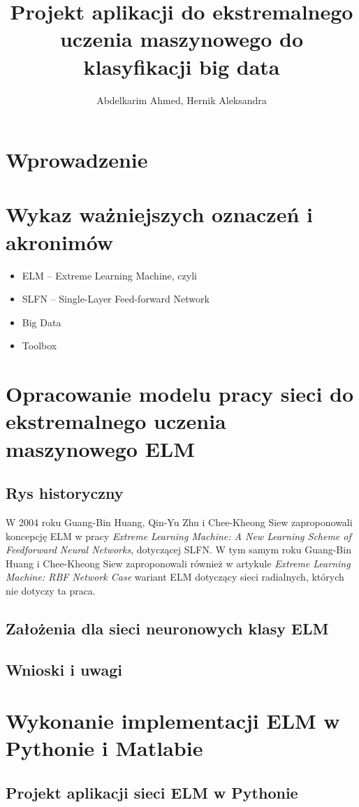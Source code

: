 \documentclass{article}
\title{Projekt aplikacji do ekstremalnego uczenia maszynowego do klasyfikacji big data}
\author{Abdelkarim Ahmed, Hernik Aleksandra}
\date{}
\begin{document}
\maketitle
\tableofcontents

\section*{Wprowadzenie}
\section*{Wykaz ważniejszych oznaczeń i akronimów}
\begin{itemize}
\item ELM -- Extreme Learning Machine, czyli 
\item SLFN -- Single-Layer Feed-forward Network 
\item Big Data
\item Toolbox
\end{itemize}
\section{Opracowanie modelu pracy sieci do ekstremalnego uczenia maszynowego ELM}
\subsection{Rys historyczny}
W 2004 roku Guang-Bin Huang, Qin-Yu Zhu i Chee-Kheong Siew zaproponowali koncepcję ELM w pracy \textit{Extreme Learning Machine: A New Learning Scheme of Feedforward Neural Networks}, dotyczącej SLFN. W tym samym roku Guang-Bin Huang i Chee-Kheong Siew zaproponowali również w artykule \textit{Extreme Learning Machine: RBF Network Case} wariant ELM dotyczący sieci radialnych, których nie dotyczy ta praca. 
\subsection{Założenia dla sieci neuronowych klasy ELM}
\subsection{Wnioski i uwagi}
\section{Wykonanie implementacji ELM w Pythonie i Matlabie}
\subsection{Projekt aplikacji sieci ELM w Pythonie}
\end{document}

